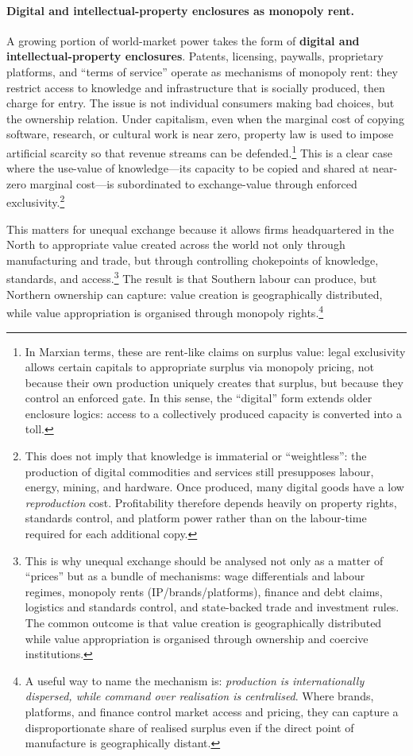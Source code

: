 \paragraph{Digital and intellectual-property enclosures as monopoly rent.}
A growing portion of world-market power takes the form of \textbf{digital and intellectual-property enclosures}.
Patents, licensing, paywalls, proprietary platforms, and ``terms of service'' operate as mechanisms of monopoly rent:
they restrict access to knowledge and infrastructure that is socially produced, then charge for entry.
The issue is not individual consumers making bad choices, but the ownership relation. Under capitalism,
even when the marginal cost of copying software, research, or cultural work is near zero, property law is used to
impose artificial scarcity so that revenue streams can be defended.\footnote{In Marxian terms, these are rent-like claims
on surplus value: legal exclusivity allows certain capitals to appropriate surplus via monopoly pricing, not because their
own production uniquely creates that surplus, but because they control an enforced gate. In this sense, the ``digital'' form
extends older enclosure logics: access to a collectively produced capacity is converted into a toll.}
This is a clear case where the use-value of knowledge---its capacity to be copied and shared at near-zero marginal cost---is
subordinated to exchange-value through enforced exclusivity.\footnote{This does not imply that knowledge is immaterial or
``weightless'': the production of digital commodities and services still presupposes labour, energy, mining, and hardware.
Once produced, many digital goods have a low \emph{reproduction} cost.
Profitability therefore depends heavily on property rights, standards
control, and platform power rather than on the labour-time required for each
additional copy.}

This matters for unequal exchange because it allows firms headquartered in the North to appropriate value created across the world
not only through manufacturing and trade, but through controlling chokepoints of knowledge, standards, and access.\footnote{This is why unequal exchange
should be analysed not only as a matter of ``prices'' but as a bundle of mechanisms: wage differentials and labour regimes, monopoly rents (IP/brands/platforms), finance
and debt claims, logistics and standards control, and state-backed trade and investment rules. The common outcome is that value creation is geographically distributed while
value appropriation is organised through ownership and coercive institutions.}
The result is that Southern labour can produce, but Northern ownership can capture: value creation is geographically distributed,
while value appropriation is organised through monopoly rights.\footnote{A useful way to name the mechanism is:
\emph{production is internationally dispersed, while command over realisation is centralised}. Where brands, platforms, and finance control market access and pricing,
they can capture a disproportionate share of realised surplus even if the direct point of manufacture is geographically distant.}

